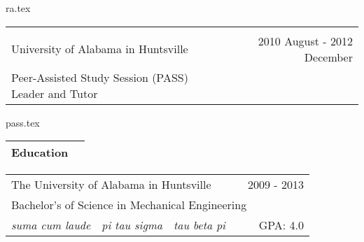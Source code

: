 \documentclass[10pt,a4paper]{article}
\begin{document}
{ra.tex}

\noindent\begin{tabularx}{\textwidth}{Xr}
  \Large \\ \bottomrule \\
  University of Alabama in Huntsville & 2010 August - 2012 December \\
  Peer-Assisted Study Session (PASS) Leader and Tutor & \\
\end{tabularx}

{pass.tex}

\noindent\begin{tabularx}{\textwidth}{Xr}
  \Large Education & \\
  \bottomrule
\end{tabularx}
\smallskip

\noindent\begin{tabularx}{\textwidth}{cccXr}
  \multicolumn{3}{l}{The University of Alabama in Huntsville} & & 2009 - 2013 \\
  \multicolumn{5}{l}{\hspace{.125in} Bachelor's of Science in Mechanical Engineering} \\
  \hspace{.125in} \textit{suma cum laude} & \textit{pi tau sigma} & \textit{tau beta pi}  & & GPA: 4.0 \\
\end{tabularx}
\bigskip
\end{document}
